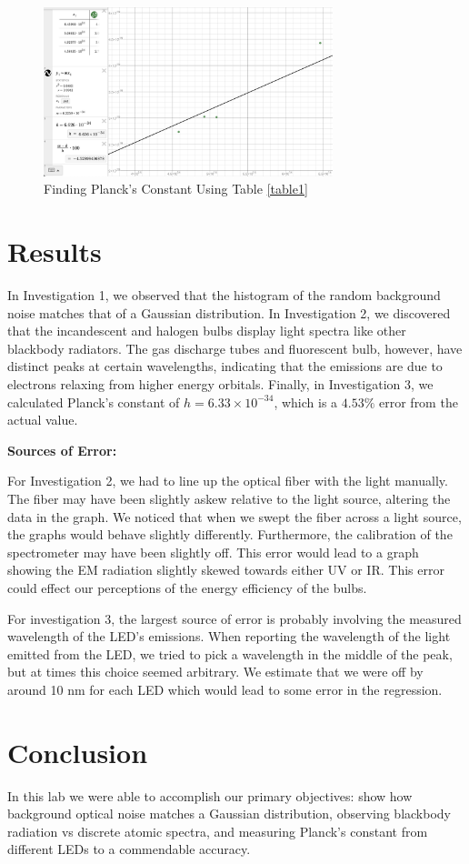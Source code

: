 \documentclass{article}[12pt]
\begin{document}
\begin{figure} [H]
  \center
  \includegraphics[width=0.75\textwidth]{figures/lin_approx.png}
  \caption{Finding Planck's Constant Using Table \ref{table1}}
  \label{linear_approx}
\end{figure}

\section{Results}

In Investigation 1, we observed that the histogram of the random background noise matches that of a Gaussian distribution.
In Investigation 2, we discovered that the incandescent and halogen bulbs display light spectra like other blackbody radiators. The gas discharge tubes and fluorescent bulb, however, have distinct peaks at certain wavelengths, indicating that the emissions are due to electrons relaxing from higher energy orbitals.
Finally, in Investigation 3, we calculated Planck's constant of $ h=6.33 \times 10 ^{-34}  $, which is a $ 4.53 \% $ error from the actual value.

\noindent \textbf{Sources of Error:}

For Investigation 2, we had to line up the optical fiber with the light manually. The fiber may have been slightly askew relative to the light source, altering the data in the graph. 
We noticed that when we swept the fiber across a light source, the graphs would behave slightly differently.
Furthermore, the calibration of the spectrometer may have been slightly off. This error would lead to a graph showing the EM radiation slightly skewed towards either UV or IR. This error could effect our perceptions of the energy efficiency of the bulbs.

For investigation 3, the largest source of error is probably involving the measured wavelength of the LED's emissions.
When reporting the wavelength of the light emitted from the LED, we tried to pick a wavelength in the middle of the peak, but at times this choice seemed arbitrary. We estimate that we were off by around 10 nm for each LED which would lead to some error in the regression.

\section{Conclusion}

In this lab we were able to accomplish our primary objectives: show how background optical noise matches a Gaussian distribution, observing blackbody radiation vs discrete atomic spectra, and measuring Planck's constant from different LEDs to a commendable accuracy.
\end{document}
